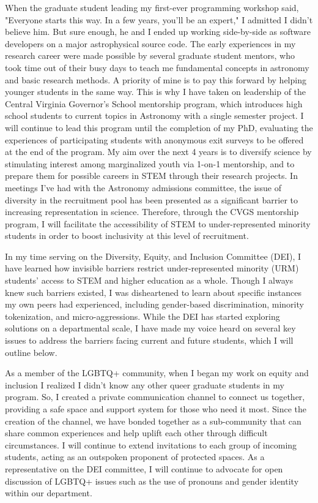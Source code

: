 \documentclass[11pt]{article}
\begin{document}
When the graduate student leading my first-ever programming workshop said, "Everyone starts this way. In a few years, you'll be an expert," I admitted I didn't believe him. But sure enough, he and I ended up working side-by-side as software developers on a major astrophysical source code. The early experiences in my research career were made possible by several graduate student mentors, who took time out of their busy days to teach me fundamental concepts in astronomy and basic research methods. A priority of mine is to pay this forward by helping younger students in the same way. This is why I have taken on leadership of the Central Virginia Governor's School mentorship program, which introduces high school students to current topics in Astronomy with a single semester project. I will continue to lead this program until the completion of my PhD, evaluating the experiences of participating students with anonymous exit surveys to be offered at the end of the program. My aim over the next 4 years is to diversify science by stimulating interest among marginalized youth via 1-on-1 mentorship, and to prepare them for possible careers in STEM through their research projects. In meetings I've had with the Astronomy admissions committee, the issue of diversity in the recruitment pool has been presented as a significant barrier to increasing representation in science. Therefore, through the CVGS mentorship program, I will facilitate the accessibility of STEM to under-represented minority students in order to boost inclusivity at this level of recruitment.

In my time serving on the Diversity, Equity, and Inclusion Committee (DEI), I have learned how invisible barriers restrict under-represented minority (URM) students' access to STEM and higher education as a whole. Though I always knew such barriers existed, I was disheartened to learn about specific instances my own peers had experienced, including gender-based discrimination, minority tokenization, and micro-aggressions. While the DEI has started exploring solutions on a departmental scale, I have made my voice heard on several key issues to address the barriers facing current and future students, which I will outline below.

As a member of the LGBTQ+ community, when I began my work on equity and inclusion I realized I didn't know any other queer graduate students in my program. So, I created a private communication channel to connect us together, providing a safe space and support system for those who need it most. Since the creation of the channel, we have bonded together as a sub-community that can share common experiences and help uplift each other through difficult circumstances. I will continue to extend invitations to each group of incoming students, acting as an outspoken proponent of protected spaces. As a representative on the DEI committee, I will continue to advocate for open discussion of LGBTQ+ issues such as the use of pronouns and gender identity within our department.
\end{document}

